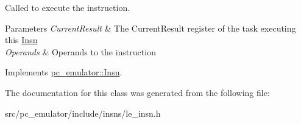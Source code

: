 Called to execute the instruction. 


\begin{DoxyParams}{Parameters}
{\em Current\+Result} & The Current\+Result register of the task executing this \hyperlink{classpc__emulator_1_1Insn}{Insn} \\
\hline
{\em Operands} & Operands to the instruction \\
\hline
\end{DoxyParams}


Implements \hyperlink{classpc__emulator_1_1Insn_a103d27030e872a799e313df16c1f3d66}{pc\+\_\+emulator\+::\+Insn}.



The documentation for this class was generated from the following file\+:\begin{DoxyCompactItemize}
\item 
src/pc\+\_\+emulator/include/insns/le\+\_\+insn.\+h\end{DoxyCompactItemize}
